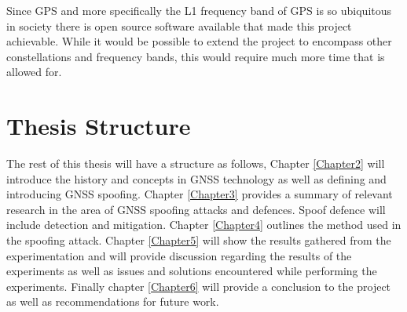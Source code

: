 Since GPS and more specifically the L1 frequency band of GPS is so ubiquitous in society there is open source software available that made this project achievable. While
it would be possible to extend the project to encompass other constellations and frequency bands, this would require much more time that is allowed for.

\section{Thesis Structure}\label{sec:structure}
The rest of this thesis will have a structure as follows, Chapter \ref{Chapter2} will introduce the history and concepts in GNSS technology as well as defining and
introducing GNSS spoofing. Chapter \ref{Chapter3} provides a summary of relevant research in the area of GNSS spoofing attacks and defences. Spoof defence will include
detection and mitigation. Chapter \ref{Chapter4} outlines the method used in the spoofing attack. Chapter \ref{Chapter5} will show the results gathered from the
experimentation and will provide discussion regarding the results of the experiments as well as issues and solutions encountered while performing the
experiments. Finally chapter \ref{Chapter6} will provide a conclusion to the project as well as recommendations for future work.